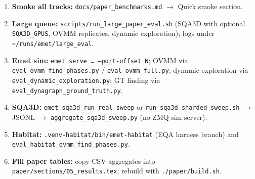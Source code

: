 \begin{enumerate}
  \item \textbf{Smoke all tracks:} \texttt{docs/paper\_benchmarks.md} $\rightarrow$ Quick smoke section.
  \item \textbf{Large queue:} \texttt{scripts/run\_large\_paper\_eval.sh} (SQA3D with optional \texttt{SQA3D\_GPUS}, OVMM replicates, dynamic exploration); logs under \texttt{\textasciitilde/runs/emet/large\_eval}.
  \item \textbf{Emet sim:} \texttt{emet serve … --port-offset N}; OVMM via \texttt{eval\_ovmm\_find\_phases.py} / \texttt{eval\_ovmm\_full.py}; dynamic exploration via \texttt{eval\_dynamic\_exploration.py}; GT finding via \texttt{eval\_dynagraph\_ground\_truth.py}.
  \item \textbf{SQA3D:} \texttt{emet sqa3d run-real-sweep} or \texttt{run\_sqa3d\_sharded\_sweep.sh} $\rightarrow$ JSONL $\rightarrow$ \texttt{aggregate\_sqa3d\_sweep.py} (no ZMQ sim server).
  \item \textbf{Habitat:} \texttt{.venv-habitat/bin/emet-habitat} (EQA harness branch) and \texttt{eval\_habitat\_ovmm\_find\_phases.py}.
  \item \textbf{Fill paper tables:} copy CSV aggregates into \texttt{paper/sections/05\_results.tex}; rebuild with \texttt{./paper/build.sh}.
\end{enumerate}
